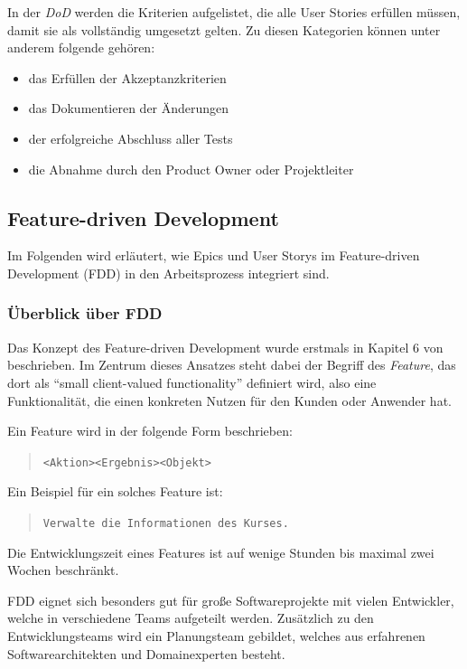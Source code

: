 \documentclass[acmtog]{acmart}
\begin{document}
In der \emph{DoD} werden die Kriterien aufgelistet, die alle User Stories erfüllen müssen, damit sie als vollständig umgesetzt gelten. Zu diesen Kategorien können unter anderem 
folgende gehören: 
\begin{itemize}
  \item das Erfüllen der Akzeptanzkriterien
  \item das Dokumentieren der Änderungen
  \item der erfolgreiche Abschluss aller Tests
  \item die Abnahme durch den Product Owner oder Projektleiter
\end{itemize}


\subsection{Feature-driven Development}
Im Folgenden wird erläutert, wie Epics und User Storys im Feature-driven Development (FDD) in den Arbeitsprozess integriert sind.

\subsubsection{Überblick über FDD}
Das Konzept des Feature-driven Development wurde erstmals in Kapitel 6 von \cite{coad99} beschrieben.
Im Zentrum dieses Ansatzes steht dabei der Begriff des \emph{Feature}, das dort als ``small client-valued functionality'' definiert wird, also eine Funktionalität, die einen konkreten Nutzen für den Kunden oder Anwender hat.

Ein Feature wird in der folgende Form beschrieben:

\begin{quote}
	\texttt{<Aktion>\hspace{5ex}<Ergebnis>\hspace{5ex}<Objekt>}
\end{quote}

Ein Beispiel für ein solches Feature ist:

\begin{quote}
	\texttt{Verwalte die Informationen des Kurses.}
\end{quote}

Die Entwicklungszeit eines Features ist auf wenige Stunden bis maximal zwei Wochen beschränkt.

FDD eignet sich besonders gut für große Softwareprojekte mit vielen Entwickler, welche in verschiedene Teams aufgeteilt werden.
Zusätzlich zu den Entwicklungsteams wird ein Planungsteam gebildet, welches aus erfahrenen Softwarearchitekten und Domainexperten besteht.
\end{document}
